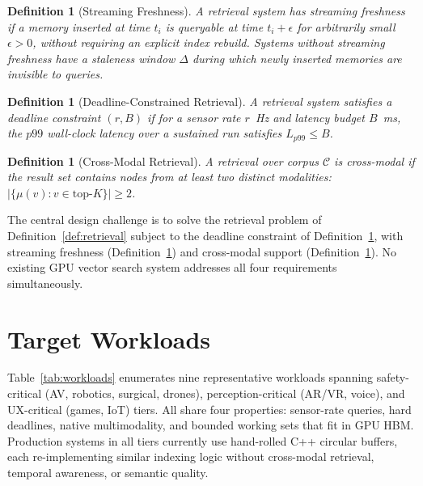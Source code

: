 \documentclass[11pt]{article}
\newtheorem{definition}[theorem]{Definition}
\begin{document}
\begin{definition}[Streaming Freshness]
\label{def:freshness}
A retrieval system has \emph{streaming freshness} if a memory inserted
at time $t_i$ is queryable at time $t_i + \epsilon$ for arbitrarily
small $\epsilon > 0$, without requiring an explicit index rebuild.
Systems without streaming freshness have a \emph{staleness window}
$\Delta$ during which newly inserted memories are invisible to queries.
\end{definition}

\begin{definition}[Deadline-Constrained Retrieval]
\label{def:deadline}
A retrieval system satisfies a deadline constraint $(r, B)$ if for a
sensor rate $r$~Hz and latency budget $B$~ms, the $p99$ wall-clock
latency over a sustained run satisfies $L_{p99} \leq B$.
\end{definition}

\begin{definition}[Cross-Modal Retrieval]
\label{def:crossmodal}
A retrieval over corpus $\mathcal{C}$ is \emph{cross-modal} if the
result set contains nodes from at least two distinct modalities:
$|\{\mu(v) : v \in \mathrm{top}\text{-}K\}| \geq 2$.
\end{definition}

The central design challenge is to solve the retrieval problem of
Definition~\ref{def:retrieval} subject to the deadline constraint of
Definition~\ref{def:deadline}, with streaming freshness
(Definition~\ref{def:freshness}) and cross-modal support
(Definition~\ref{def:crossmodal}). No existing GPU vector search system
addresses all four requirements simultaneously.

\section{Target Workloads}
\label{sec:workloads}

Table~\ref{tab:workloads} enumerates nine representative workloads
spanning safety-critical (AV, robotics, surgical, drones),
perception-critical (AR/VR, voice), and UX-critical (games, IoT) tiers.
All share four properties: sensor-rate queries, hard deadlines, native
multimodality, and bounded working sets that fit in GPU HBM. Production
systems in all tiers currently use hand-rolled C++ circular buffers,
each re-implementing similar indexing logic without cross-modal
retrieval, temporal awareness, or semantic quality.
\end{document}
